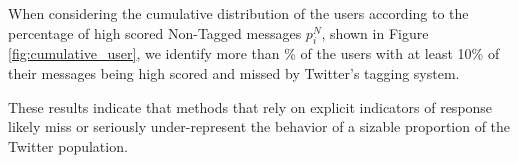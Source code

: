 When considering the cumulative distribution of the users according to the percentage of high scored Non-Tagged messages $p_i^N$, shown in Figure \ref{fig:cumulative_user}, we identify more than \usersMoreThanTenPctPct{}\% of the users with at least 10\% of their messages being high scored and missed by Twitter's tagging system. 

These results indicate that methods that rely on explicit indicators of response likely miss or seriously under-represent the behavior of a sizable proportion of the Twitter population.

